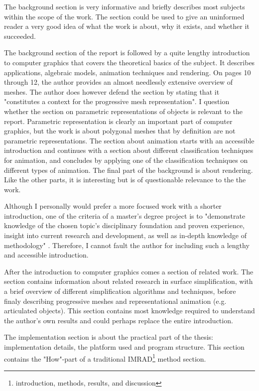 \documentclass{article}
\begin{document}
The background section is very informative and briefly describes most subjects
within the scope of the work. The section could be used to give an uninformed
reader a very good idea of what the work is about, why it exists, and whether it
succeeded.

The background section of the report is followed by a quite lengthy introduction
to computer graphics that covers the theoretical basics of the subject. It
describes applications, algebraic models, animation techniques and rendering. On
pages 10 through 12, the author provides an almost needlessly extensive overview
of meshes. The author does however defend the section by stating that it
"constitutes a context for the progressive mesh representation". I question
whether the section on parametric representations of objects is relevant to the
report. Parametric representation is clearly an important part of computer
graphics, but the work is about polygonal meshes that by definition are not
parametric representations. The section about animation starts with an
accessible introduction and continues with a section about different
classification techniques for animation, and concludes by applying one of the
classification techniques on different types of animation. The final part of the
background is about rendering. Like the other parts, it is interesting but is of
questionable relevance to the the work.

Although I personally would prefer a more focused work with a shorter
introduction, one of the criteria of a master's degree project is to
"demonstrate knowledge of the chosen topic's disciplinary foundation and proven
experience, insight into current research and development, as well as in-depth
knowledge of methodology" \citep{hogfeldt}. Therefore, I cannot fault the author
for including such a lengthy and accessible introduction.

After the introduction to computer graphics comes a section of related work. The
section contains information about related research in surface simplification,
with a brief overview of different simplification algorithms and techniques,
before finaly describing progressive meshes and representational animation (e.g.
articulated objects). This section contains most knowledge required to
understand the author's own results and could perhaps replace the entire
introduction.

The implementation section is about the practical part of the thesis:
implementation details, the platform used and program structure. This section
contains the "How"-part of a traditional IMRAD\footnote{introduction, methods,
results, and discussion} method section.
\end{document}
